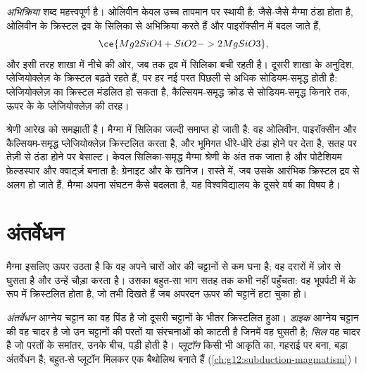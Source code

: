 \emph{अभिक्रिया} शब्द महत्त्वपूर्ण है। ओलिवीन केवल उच्च तापमान पर
स्थायी है: जैसे-जैसे मैग्मा ठंडा होता है, ओलिवीन के क्रिस्टल द्रव के सिलिका से अभिक्रिया करते हैं
और पाइरॉक्सीन में बदल जाते हैं,
\[
  \ce{Mg2SiO4 + SiO2 -> 2 MgSiO3},
\]
और इसी तरह शाखा में नीचे की ओर, जब तक द्रव में सिलिका बची रहती है।
दूसरी शाखा के अनुदिश, प्लेजियोक्लेज़ के क्रिस्टल बढ़ते रहते हैं, पर हर नई परत
पिछली से अधिक सोडियम-समृद्ध होती है: प्लेजियोक्लेज़ का क्रिस्टल मंडलित हो सकता है,
कैल्सियम-समृद्ध क्रोड से सोडियम-समृद्ध किनारे तक, ऊपर के  के
प्लेजियोक्लेज़  की तरह।

श्रेणी आरेख को समझाती है।  मैग्मा में सिलिका जल्दी समाप्त हो जाती है: वह
ओलिवीन, पाइरॉक्सीन और कैल्सियम-समृद्ध प्लेजियोक्लेज़ क्रिस्टलित करता है, और
भूमिगत धीरे-धीरे ठंडा होने पर  देता है, सतह पर तेज़ी से ठंडा होने पर
बेसाल्ट। केवल सिलिका-समृद्ध मैग्मा श्रेणी के अंत तक जाता है और
पोटैशियम फ़ेल्डस्पार और क्वार्ट्ज़ बनाता है: ग्रेनाइट और  के खनिज।
रास्ते में, जब उसके आरंभिक क्रिस्टल द्रव से अलग हो जाते हैं, मैग्मा अपना संघटन
कैसे बदलता है, यह विश्वविद्यालय के दूसरे वर्ष का विषय है।

\section{अंतर्वेधन}

मैग्मा इसलिए ऊपर उठता है कि वह अपने चारों ओर की चट्टानों से कम घना है; वह
दरारों में ज़ोर से घुसता है और उन्हें चौड़ा करता है। उसका बहुत-सा भाग सतह तक कभी नहीं पहुँचता:
वह भूपर्पटी में  के रूप में क्रिस्टलित होता है, जो तभी दिखते हैं जब
अपरदन ऊपर की चट्टानें हटा चुका हो।

\begin{definition}[डाइक; सिल; प्लूटॉन]\label{def:g11:igneous-rocks:intrusion}
\emph{अंतर्वेधन} आग्नेय चट्टान का वह पिंड है जो
दूसरी चट्टानों के भीतर क्रिस्टलित हुआ। \emph{डाइक} आग्नेय चट्टान की
वह चादर है जो उन चट्टानों की परतों या संरचनाओं को काटती है जिनमें वह
घुसती है; \emph{सिल} वह चादर है जो परतों के समांतर,
उनके बीच, पड़ी होती है। \emph{प्लूटॉन} किसी भी आकृति का, गहराई पर बना,
बड़ा अंतर्वेधन है; बहुत-से प्लूटॉन मिलकर एक
बैथोलिथ बनाते हैं (\cref{ch:g12:subduction-magmatism})।
\end{definition}

